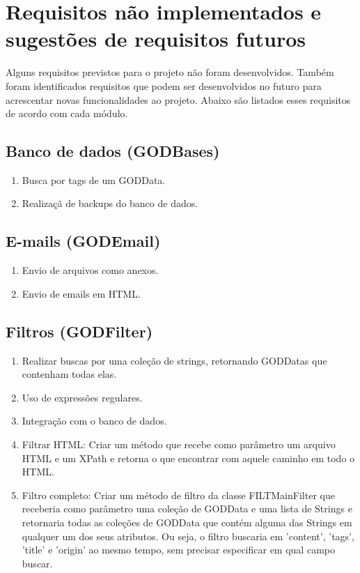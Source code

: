 \section{Requisitos não implementados e sugestões de requisitos futuros}

Alguns requisitos previstos para o projeto não foram desenvolvidos. Também foram identificados requisitos que podem ser desenvolvidos no futuro para acrescentar novas funcionalidades ao projeto. Abaixo são listados esses requisitos de acordo com cada módulo.

\subsection{Banco de dados (GODBases)}
\begin{enumerate}
\item Busca por tags de um GODData.
\item Realizaçã de backups do banco de dados.
\end{enumerate}

\subsection{E-mails (GODEmail)}
\begin{enumerate}
\item Envio de arquivos como anexos.
\item Envio de emails em HTML.
\end{enumerate}

\subsection{Filtros (GODFilter)}
\begin{enumerate}
\item Realizar buscas por uma coleção de strings, retornando GODDatas que contenham todas elas.
\item Uso de expressões regulares.
\item Integração com o banco de dados.
\item Filtrar HTML: Criar um método que recebe como parâmetro um arquivo HTML e um XPath e retorna o que encontrar com aquele caminho em todo o HTML.
\item Filtro completo: Criar um método de filtro da classe FILTMainFilter que receberia como parâmetro uma coleção de GODData e uma lista de Strings e retornaria todas as coleções de GODData que contém alguma das Strings em qualquer um dos seus atributos. Ou seja, o filtro buscaria em 'content', 'tags', 'title' e 'origin' ao mesmo tempo, sem precisar especificar em qual campo buscar.
\end{enumerate}

